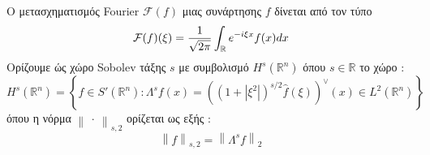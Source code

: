 \documentclass[twoside,nofonts,internet,shmeiwseis]{thewria}
\DeclareRobustCommand{\frac}[3][0pt]{%
{\begingroup\hspace{#1}#2\hspace{#1}\endgroup\over\hspace{#1}#3\hspace{#1}}}
\begin{document}
\clearpage
{}
\orismoi
{}
Ο μετασχηματισμός Fourier $ \mathcal{F}(f) $ μιας συνάρτησης $ f $ δίνεται από τον τύπο
\[ \mathcal{F}(f)(\xi)=\frac{1}{\sqrt{2\pi}}\int_\mathbb{R}e^{-i\xi x}f(x)dx \]
Ορίζουμε ώς χώρο Sobolev τάξης $ s $ με συμβολισμό $ H^s\left( \mathbb{R}^n\right)  $ όπου $ s\in\mathbb{R} $ το χώρο :
\[ H^s\left( \mathbb{R}^n\right)=\left\lbrace f\in S'(\mathbb{R}^n) : \varLambda^s f(x)=\left(\left(1+|\xi^2| \right)^{s/2}\hat{f}(\xi)  \right)^\vee(x)\in L^2(\mathbb{R}^n)  \right\rbrace \]
όπου η νόρμα $ \left\|\ \cdot\  \right\|_{s,2}  $ ορίζεται ως εξής :
\[ \left\|f \right\|_{s,2}=\left\|\varLambda^s f \right\|_2   \]
\end{document}
